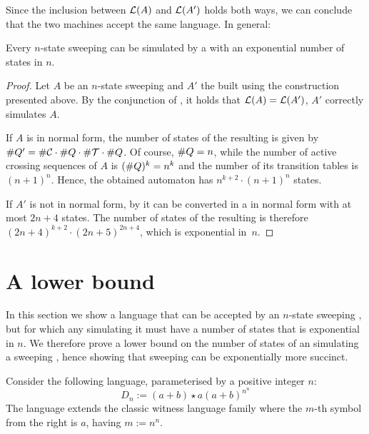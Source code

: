 Since the inclusion between $\mathcal L(A)$ and $\mathcal L(A')$ holds both ways, we can conclude that the two machines accept the same language.
In general:
\begin{thrm}\label{thm:swkLAtoNFA}
	Every $n$-state sweeping \kDLA can be simulated by a \ONFA with an exponential number of states in $n$.
\end{thrm}
\begin{proof}
	Let $A$ be an $n$-state sweeping \kDLA and $A'$ the \ONFA built using the construction presented above.
	By the conjunction of , it holds that $\mathcal L(A)=\mathcal L(A')$, \ie $A'$ correctly simulates $A$.

	If $A$ is in normal form, the number of states of the resulting \NFA is given by $\# Q'=\# \mathcal C\cdot\# Q\cdot\# \mathcal T\cdot\# Q$.
	Of course, $\# Q=n$, while the number of active crossing sequences of $A$ is $(\# Q)^k=n^k$ and the number of its transition tables is $(n+1)^n$.
	Hence, the obtained automaton has $n^{k+2}\cdot(n+1)^n$ states.

	If $A'$ is not in normal form, by  it can be converted in a \kDLA in normal form with at most $2n+4$ states.
	The number of states of the resulting \NFA is therefore $(2n+4)^{k+2}\cdot(2n+5)^{2n+4}$, which is exponential in~$n$.
\end{proof}



\section{A lower bound}
In this section we show a language that can be accepted by an $n$-state sweeping \kDLA, but for which any \ONFA simulating it must have a number of states that is exponential in $n$.
We therefore prove a lower bound on the number of states of an \ONFA simulating a sweeping \kDLA, hence showing that sweeping \kDLAs can be exponentially more succinct.

Consider the following language, parameterised by a positive integer $n$:
\begin{equation}\label{eq:lowersweep}
	D_n := (a+b)\star a (a+b)^{n^n}
\end{equation}
The language extends the classic witness language family where the $m$-th symbol from the right is $a$, having $m:=n^n$.


